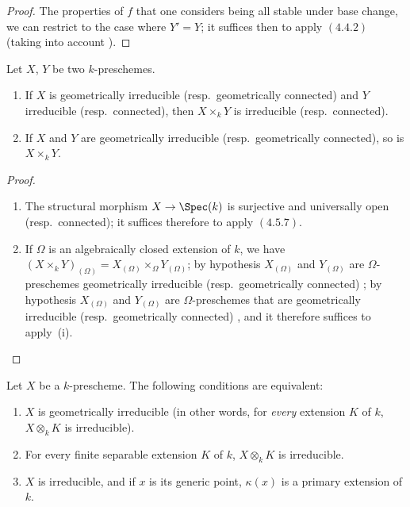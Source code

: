 \begin{proof}
The properties of $f$ that one considers being all stable under base change, we can restrict to the case where $Y'=Y$; it suffices then to apply $(4.4.2)$ (taking into account ).
\end{proof}

\begin{corollary}[4.5.8]
\label{IV.4.5.8}
Let $X$, $Y$ be two $k$-preschemes.
\begin{enumerate}[label=(\roman*)]
  \item If $X$ is geometrically irreducible (resp.\ geometrically connected) and $Y$ irreducible (resp.\ connected), then $X\times_k Y$ is irreducible (resp.\ connected).
  \item If $X$ and $Y$ are geometrically irreducible (resp.\ geometrically connected), so is $X\times_k Y$.
\end{enumerate}
\end{corollary}

\begin{proof}
\begin{enumerate}[label=(\roman*)]
  \item The structural morphism $X\to\Spec(k)$ is surjective and universally open (resp.\ connected); it suffices therefore to apply $(4.5.7)$.
  \item If $\Omega$ is an algebraically closed extension of $k$, we have $(X\times_k Y)_{(\Omega)}=X_{(\Omega)}\times_\Omega Y_{(\Omega)}$; by hypothesis $X_{(\Omega)}$ and $Y_{(\Omega)}$ are $\Omega$-preschemes geometrically irreducible (resp.\ geometrically connected) ; by hypothesis $X_{(\Omega)}$ and $Y_{(\Omega)}$ are $\Omega$-preschemes that are geometrically irreducible (resp.\ geometrically connected) , and it therefore suffices to apply~(i).
\end{enumerate}
\end{proof}

\begin{proposition}[4.5.9]
\label{IV.4.5.9}
Let $X$ be a $k$-prescheme.
The following conditions are equivalent:
\begin{enumerate}[label=\emph{\alph*)}]
  \item $X$ is geometrically irreducible (in other words, for \emph{every} extension $K$ of $k$, $X\otimes_k K$ is irreducible).
  \item For every finite separable extension $K$ of $k$, $X\otimes_k K$ is irreducible.
  \item $X$ is irreducible, and if $x$ is its generic point, $\kappa(x)$ is a primary extension of $k$.
\end{enumerate}
\end{proposition}

